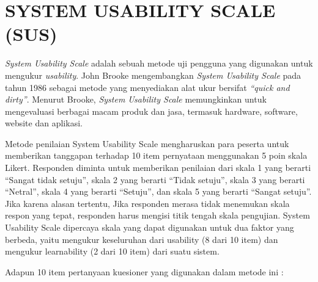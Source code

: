 \section{\uppercase{System Usability Scale (SUS)}}
\textit{System Usability Scale} adalah sebuah metode uji pengguna yang digunakan untuk mengukur \textit{usability}. John Brooke mengembangkan \textit{System Usability Scale} pada tahun 1986 sebagai metode yang menyediakan alat ukur bersifat \textit{“quick and dirty”}. Menurut Brooke, \textit{System Usability Scale} memungkinkan untuk mengevaluasi berbagai macam produk dan jasa, termasuk hardware, software, website dan aplikasi. 

\par Metode penilaian System Usability Scale mengharuskan para peserta untuk memberikan tanggapan terhadap 10 item pernyataan menggunakan 5 poin skala Likert. Responden diminta untuk memberikan penilaian dari skala 1 yang berarti “Sangat tidak setuju”, skala 2 yang berarti “Tidak setuju”, skala 3 yang berarti “Netral”, skala 4 yang berarti “Setuju”, dan skala 5 yang berarti “Sangat setuju”. Jika karena alasan tertentu, Jika responden merasa tidak menemukan skala respon yang tepat, responden harus mengisi titik tengah skala pengujian. System Usability Scale dipercaya skala yang dapat digunakan untuk dua faktor yang berbeda, yaitu mengukur keseluruhan dari usability (8 dari 10 item) dan mengukur learnability 
(2 dari 10 item) dari suatu sistem. 

\par Adapun 10 item pertanyaan kuesioner yang digunakan dalam metode ini :

